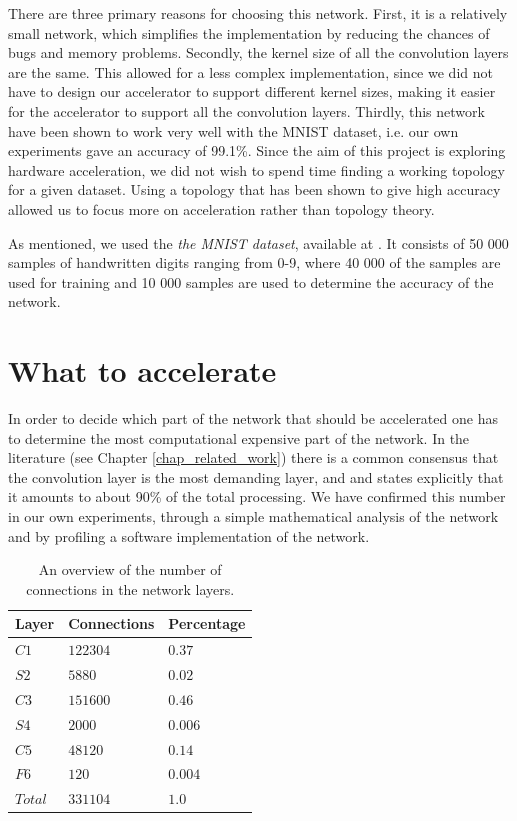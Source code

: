There are three primary reasons for choosing this network. First, it is a relatively small network, which simplifies the implementation by reducing the chances of bugs and memory problems. Secondly, the kernel size of all the convolution layers are the same. This allowed for a less complex implementation, since we did not have to design our accelerator to support different kernel sizes, making it easier for the accelerator to support all the convolution layers. Thirdly, this network have been shown to work very well with the MNIST dataset, i.e. our own experiments gave an accuracy of 99.1\%. Since the aim of this project is exploring hardware acceleration, we did not wish to spend time finding a working topology for a given dataset. Using a topology that has been shown to give high accuracy allowed us to focus more on acceleration rather than topology theory.   

 As mentioned, we used the \textit{the MNIST dataset}, available at \cite{LeCun1998a}. It consists of 50 000 samples of handwritten digits ranging from 0-9, where 40 000 of the samples are used for
training and 10 000 samples are used to determine the accuracy of the network. 

\section{What to accelerate} \label{sec_what_to_accelerate}

In order to decide which part of the network that should be accelerated one has to determine the most computational expensive part of the network. In the literature (see Chapter \ref{chap_related_work}) there is a common consensus that the convolution layer is the most demanding layer, and \cite{Farabet2010} and \cite{Zhang2015} states explicitly that it amounts to about 90\% of the total processing. We have confirmed this number in our own experiments, through a simple mathematical analysis of the network and by profiling a software implementation of the network. 

\begin{table}
	\centering
    \begin{tabular}{| >{\centering\arraybackslash}m{0.8in} | >{\centering\arraybackslash}m{1.0in} | >{\centering\arraybackslash}m{1.0in} |}
    \hline
    Layer & Connections & Percentage  \\ \hline
    $ C1 $ & $ 122304 $ & $ 0.37 $ \\ \hline
    $ S2 $ & $ 5880  $ & $ 0.02 $ \\ \hline
    $ C3 $ & $ 151600 $ & $ 0.46 $  \\ \hline
    $ S4 $ & $ 2000 $ & $ 0.006 $ \\ \hline
    $ C5 $ & $ 48120 $ & $ 0.14 $  \\ \hline
    $ F6 $ & $ 120 $ & $ 0.004 $ \\ \hline
    $ Total $ & $ 331104 $ & $ 1.0 $  \\ \hline
        \end{tabular}
    \caption[Number of connections in the network]{An overview of the number of connections in the network layers.}
   	\label{tab_nofOps}
\end{table}

